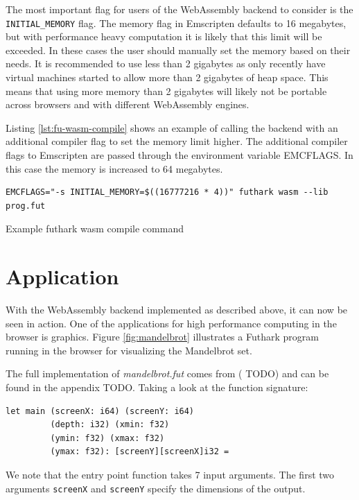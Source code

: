 \documentclass[11pt]{book}
\begin{document}
The most important flag for users of the WebAssembly backend to consider is the \texttt{INITIAL\_MEMORY} flag. The memory flag in Emscripten defaults to 16 megabytes, but with performance heavy computation it is likely that this limit will be exceeded. In these cases the user should manually set the memory based on their needs. It is recommended to use less than 2 gigabytes as only recently have virtual machines started to allow more than 2 gigabytes of heap space. This means that using more memory than 2 gigabytes will likely not be portable across browsers and with different WebAssembly engines. 

Listing \ref{lst:fu-wasm-compile} shows an example of calling the backend with an additional compiler flag to set the memory limit higher. The additional compiler flags to Emscripten are passed through the environment variable EMCFLAGS. In this case the memory is increased to 64 megabytes.

\begin{listing}
\begin{verbatim}
EMCFLAGS="-s INITIAL_MEMORY=$((16777216 * 4))" futhark wasm --lib prog.fut
\end{verbatim}
\caption{Example futhark wasm compile command}
\label{lst:fu-wasm-compile}
\end{listing}

\section{Application}
\label{sec:mandelbrot}

With the WebAssembly backend implemented as described above, it can now be seen in action. One of the applications for high performance computing in the browser is graphics. Figure \ref{fig:mandelbrot} illustrates a Futhark program running in the browser for visualizing the Mandelbrot set. 

The full implementation of \textit{mandelbrot.fut}
comes from ({\color{red} TODO})
and can be found in the appendix {\color{red} TODO}. Taking a look at the function signature:
\begin{verbatim}
let main (screenX: i64) (screenY: i64)
         (depth: i32) (xmin: f32)
         (ymin: f32) (xmax: f32)
         (ymax: f32): [screenY][screenX]i32 =
\end{verbatim}

We note that the entry point function takes 7 input arguments. The first two arguments \texttt{screenX} and \texttt{screenY} specify the dimensions of the output. 
\end{document}

